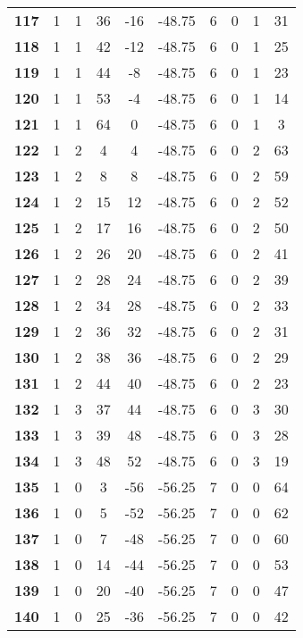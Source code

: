 \documentclass{article}%
\begin{document}
\begin{longtable}{cccccccccc}
        \textbf{117} & 1 & 1 & 36 & -16 & -48.75 & 6 & 0 & 1 & 31 \\ 
        \textbf{118} & 1 & 1 & 42 & -12 & -48.75 & 6 & 0 & 1 & 25 \\ 
        \textbf{119} & 1 & 1 & 44 & -8 & -48.75 & 6 & 0 & 1 & 23 \\ 
        \textbf{120} & 1 & 1 & 53 & -4 & -48.75 & 6 & 0 & 1 & 14 \\ 
        \textbf{121} & 1 & 1 & 64 & 0 & -48.75 & 6 & 0 & 1 & 3 \\ 
        \textbf{122} & 1 & 2 & 4 & 4 & -48.75 & 6 & 0 & 2 & 63 \\ 
        \textbf{123} & 1 & 2 & 8 & 8 & -48.75 & 6 & 0 & 2 & 59 \\ 
        \textbf{124} & 1 & 2 & 15 & 12 & -48.75 & 6 & 0 & 2 & 52 \\ 
        \textbf{125} & 1 & 2 & 17 & 16 & -48.75 & 6 & 0 & 2 & 50 \\ 
        \textbf{126} & 1 & 2 & 26 & 20 & -48.75 & 6 & 0 & 2 & 41 \\ 
        \textbf{127} & 1 & 2 & 28 & 24 & -48.75 & 6 & 0 & 2 & 39 \\ 
        \textbf{128} & 1 & 2 & 34 & 28 & -48.75 & 6 & 0 & 2 & 33 \\ 
        \textbf{129} & 1 & 2 & 36 & 32 & -48.75 & 6 & 0 & 2 & 31 \\ 
        \textbf{130} & 1 & 2 & 38 & 36 & -48.75 & 6 & 0 & 2 & 29 \\ 
        \textbf{131} & 1 & 2 & 44 & 40 & -48.75 & 6 & 0 & 2 & 23 \\ 
        \textbf{132} & 1 & 3 & 37 & 44 & -48.75 & 6 & 0 & 3 & 30 \\ 
        \textbf{133} & 1 & 3 & 39 & 48 & -48.75 & 6 & 0 & 3 & 28 \\ 
        \textbf{134} & 1 & 3 & 48 & 52 & -48.75 & 6 & 0 & 3 & 19 \\ 
        \textbf{135} & 1 & 0 & 3 & -56 & -56.25 & 7 & 0 & 0 & 64 \\ 
        \textbf{136} & 1 & 0 & 5 & -52 & -56.25 & 7 & 0 & 0 & 62 \\ 
        \textbf{137} & 1 & 0 & 7 & -48 & -56.25 & 7 & 0 & 0 & 60 \\ 
        \textbf{138} & 1 & 0 & 14 & -44 & -56.25 & 7 & 0 & 0 & 53 \\ 
        \textbf{139} & 1 & 0 & 20 & -40 & -56.25 & 7 & 0 & 0 & 47 \\ 
        \textbf{140} & 1 & 0 & 25 & -36 & -56.25 & 7 & 0 & 0 & 42 \\ 

\end{longtable}
\end{document}
